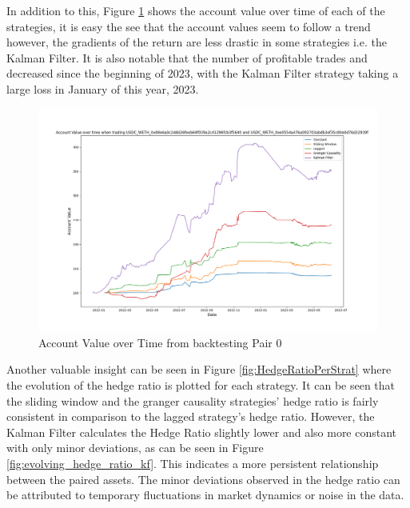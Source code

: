 In addition to this, Figure \ref{fig:ValueHistory} shows the account value over time of each of the strategies, it is easy the see that the account values seem to follow a trend however, the gradients of the return are less drastic in some strategies i.e. the Kalman Filter. It is also notable that the number of profitable trades and decreased since the beginning of 2023, with the Kalman Filter strategy taking a large loss in January of this year, 2023.

\begin{figure}[H]
    \centering
    \includegraphics[width=\linewidth]{evaluation/Images/ValueHistory.png}
    \caption{Account Value over Time from backtesting Pair 0}
    \label{fig:ValueHistory}
\end{figure}

Another valuable insight can be seen in Figure \ref{fig:HedgeRatioPerStrat} where the evolution of the hedge ratio is plotted for each strategy. It can be seen that the sliding window and the granger causality strategies' hedge ratio is fairly consistent in comparison to the lagged strategy's hedge ratio. However, the Kalman Filter calculates the Hedge Ratio slightly lower and also more constant with only minor deviations, as can be seen in Figure \ref{fig:evolving_hedge_ratio_kf}. This indicates a more persistent relationship between the paired assets. The minor deviations observed in the hedge ratio can be attributed to temporary fluctuations in market dynamics or noise in the data.

